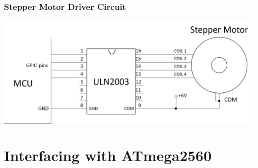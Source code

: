 \documentclass[table,10pt,red]{beamer}	%
\begin{document}
\begin{frame}
	\frametitle{Stepper Motor Driver Circuit}
	\begin{center}
		\includegraphics[width=\linewidth]{Driver}
	\end{center}
\end{frame}

\section{Interfacing with ATmega2560}
\end{document}
